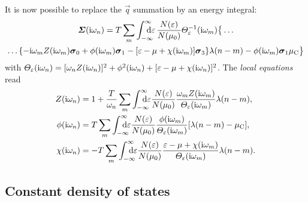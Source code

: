 It is now possible to replace the $\vec q$ summation by an energy integral:
%
\begin{multline} \label{local self-energy}
    \vec \Sigma(\I \omega_n)
    = T \sum_m \int \from{-\infty} \till \infty \D \epsilon \,
    \frac{N(\epsilon)}{N(\mu_0)}
    \Theta_\epsilon^{-1}(\I \omega_m) \big \{ \dots
        \\
        \dots \{
            - \I \omega_m Z(\I \omega_m) \vec \sigma_0
            + \phi(\I \omega_m) \vec \sigma_1
            - [\epsilon - \mu + \chi(\I \omega_m)] \vec \sigma_3
            \}
        \lambda(n - m) - \phi(\I \omega_m) \vec \sigma_1 \mu \sub C
    \big \}
\end{multline}
%
with $\varTheta_\varepsilon(\mathrm i \omega_n) = [\omega_n Z(\mathrm i \omega_n)]^2 + \phi^2(\mathrm i
\omega_n) + [\varepsilon - \mu + \chi(\mathrm i \omega_n)]^2$. The \emph{local
 equations} read
%
\begin{subequations} \label{local Eliashberg equations}
    \begin{align}
        Z(\I \omega_n) &= 1 + \frac T {\omega_n} \sum_m
        \int \from{-\infty} \till \infty \D \epsilon
        \frac{N(\epsilon)}{N(\mu_0)}
        \frac{\omega_m Z (\I \omega_m)}{\Theta_\epsilon(\I \omega_m)}
        \lambda(n - m),
        \\
        \phi(\I \omega_n) &= T \sum_m
        \int \from{-\infty} \till \infty \D \epsilon
        \frac{N(\epsilon)}{N(\mu_0)}
        \frac{\phi(\I \omega_m)}{\Theta_\epsilon(\I \omega_m)}
        [\lambda(n - m) - \mu \sub C],
        \\
        \chi(\I \omega_n) &= -T \sum_m
        \int \from{-\infty} \till \infty \D \epsilon
        \frac{N(\epsilon)}{N(\mu_0)}
        \frac{\epsilon - \mu + \chi(\I \omega_m)}{\Theta_\epsilon(\I \omega_m)}
        \lambda(n - m).
    \end{align}
\end{subequations}

\subsection{Constant density of states}

